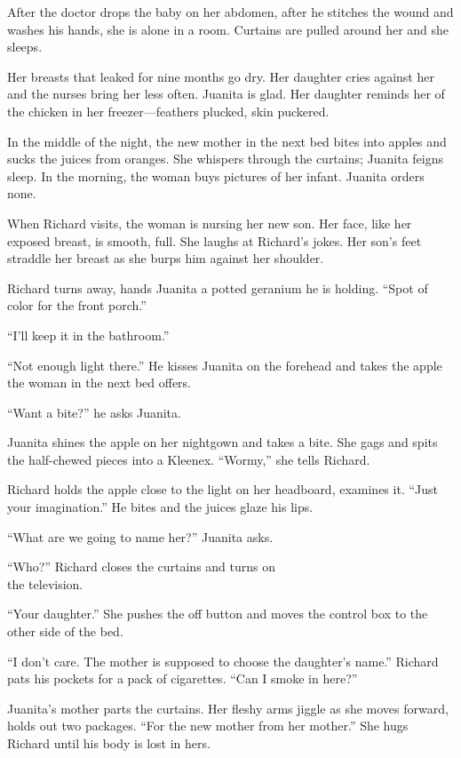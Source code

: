 \documentclass[twoside,10pt]{book}
\begin{document}
After the doctor drops the baby on her abdomen, after he stitches the
wound and washes his hands, she is alone in a room. Curtains are pulled
around her and she sleeps.

Her breasts that leaked for nine months go dry. Her daughter cries
against her and the nurses bring her less often. Juanita is glad. Her
daughter reminds her of the chicken in her freezer---feathers plucked,
skin puckered.

In the middle of the night, the new mother in the next bed bites into
apples and sucks the juices from oranges. She whispers through the
curtains; Juanita feigns sleep. In the morning, the woman buys pictures
of her infant. Juanita orders none.

When Richard visits, the woman is nursing her new son. Her face, like
her exposed breast, is smooth, full. She laughs at Richard's jokes. Her
son's feet straddle her breast as she burps him against her shoulder.

Richard turns away, hands Juanita a potted geranium he is holding.
``Spot of color for the front porch.''

``I'll keep it in the bathroom.''

``Not enough light there.'' He kisses Juanita on the forehead and takes
the apple the woman in the next bed offers.

``Want a bite?'' he asks Juanita.

Juanita shines the apple on her nightgown and takes a bite. She gags and
spits the half-chewed pieces into a Kleenex. ``Wormy,'' she tells
Richard.

Richard holds the apple close to the light on her headboard, examines
it. ``Just your imagina­tion.'' He bites and the juices glaze his lips.

``What are we going to name her?'' Juanita asks.

``Who?'' Richard closes the curtains and turns on\\
the television.

``Your daughter.'' She pushes the off button and moves the control box
to the other side of the bed.

``I don't care. The mother is supposed to choose the daughter's name.''
Richard pats his pock­ets for a pack of cigarettes. ``Can I smoke in
here?''

Juanita's mother parts the curtains. Her fleshy arms jiggle as she moves
forward, holds out two packages. ``For the new mother from her mother.''
She hugs Richard until his body is lost in hers.
\end{document}
